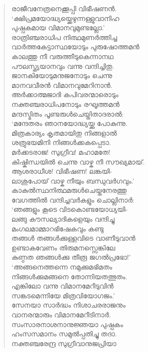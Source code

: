 \begin{verse}
രാജീവനേത്രനെക്കൂപ്പി വിഭീഷണന്‍.\\
‘ക്ഷിപ്രമയോദ്ധ്യയ്ക്കെഴുന്നള്ളുവാനിഹ\\
പുഷ്പകമായ വിമാനവുമുണ്ടല്ലോ.’\\
രാത്രിഞ്ചരാധിപ നിത്ഥമുണര്‍ത്തിച്ച\\
വാര്‍ത്തകേട്ടാസ്ഥയോടും പുരുഷോത്തമന്‍\\
കാലത്തു നീ വരുത്തീടുകെന്നാനഥ\\
പൗലസ്ത്യയാനവും വന്നു വന്ദിച്ചിതു.\\
ജാനകിയോടുമനുജനോടും ചെന്നു\\
മാനവവീരന്‍ വിമാനവുമേറിനാന്‍.\\
അര്‍ക്കാത്മജാദി കപിവരന്മാരൊടും\\
നക്തഞ്ചരാധിപനോടും രഘൂത്തമന്‍\\
മന്ദസ്മിതം പൂണ്ടരുള്‍ചെയ്തിതാദരാല്‍:\\
‘മന്ദേതരം ഞാനയോദ്ധ്യയ്ക്കു പോകുന്നു.\\
മിത്രകാര്യം കൃതമായിതു നിങ്ങളാല്‍\\
ശത്രുഭയമിനി നിങ്ങള്‍ക്കകപ്പെടാ.\\
മര്‍ക്കടരാജ! സുഗ്രീവ! മഹാമതേ!\\
കിഷ്കിന്ധയില്‍ ചെന്നു വാഴ്ക നീ സൗഖ്യമായ്.\\
ആശരാധീശ! വിഭീഷണ! ലങ്കയി-\\
ലാശുപോയ് വാഴ്ക നീയും ബന്ധുവര്‍ഗവും.’\\
കാകുല്‍സ്ഥനിത്ഥമരുള്‍ചെയ്തനേരത്തു\\
വേഗത്തില്‍ വന്ദിച്ചവര്‍കളും ചൊല്ലിനാര്‍:\\
‘ഞങ്ങളും കൂടെ വിടകൊണ്ടയോധ്യയി-\\
ലങ്ങു കൗസല്യാദികളെയും വന്ദിച്ചു\\
മംഗലമാമ്മാറഭിഷേകവും കണ്ടു\\
തങ്ങള്‍ തങ്ങള്‍ക്കുള്ളവിടെ വാണീടുവാന്‍\\
ഉണ്ടാകവേണം തിരുമനസ്സെങ്കിലേ\\
കുണ്ഠത ഞങ്ങള്‍ക്കു തീരൂ ജഗല്‍പ്രഭോ!’\\
‘അങ്ങനെത്തന്നെ നമുക്കുമഭിമതം\\
നിങ്ങള്‍ക്കുമങ്ങനെ തോന്നിയതത്ഭുതം.\\
എങ്കിലോ വന്നു വിമാനമേറീടുവിന്‍\\
സങ്കടമെന്നിയേ മിത്രവിയോഗജം.’\\
സേനയാ സാര്‍ദ്ധം നിശാചരരാജനും\\
വാനരന്മാരും വിമാനമേറീടിനാര്‍.\\
സംസാരനാശനാനുജ്ഞയാ പുഷ്പകം\\
ഹംസസമാനം സമുല്‍പ്പതിച്ചു തദാ.\\
നക്തഞ്ചരേന്ദ്ര സുഗ്രീവാനുജപ്രിയാ\\

\end{verse}
